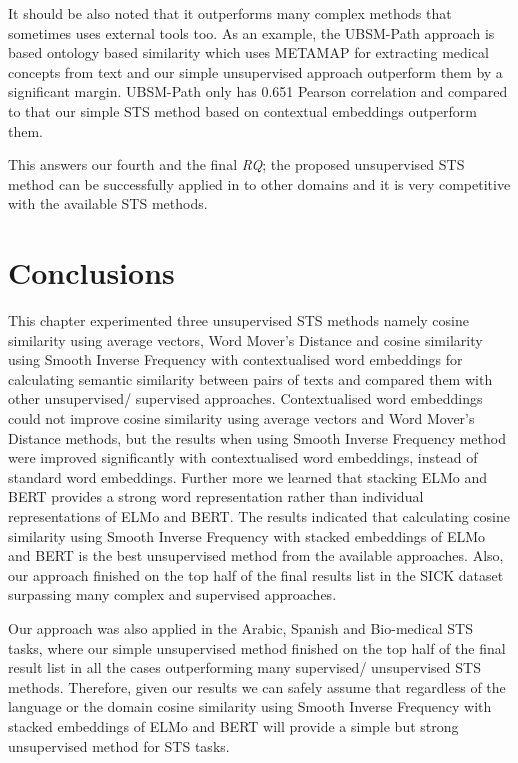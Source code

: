 It should be also noted that it outperforms many complex methods that sometimes uses external tools too. As an example, the UBSM-Path approach is based ontology based similarity which uses METAMAP \cite{Aronson2001} for extracting medical concepts from text and our simple unsupervised approach outperform them by a significant margin. UBSM-Path only has 0.651 Pearson correlation and compared to that our simple STS method based on contextual embeddings outperform them. 

This answers our fourth and the final \textit{RQ}; the proposed unsupervised STS method can be successfully applied in to other domains and it is very competitive with the available STS methods. 



\section{Conclusions}
\label{sec:state_conclusions}

This chapter experimented three unsupervised STS methods namely cosine similarity using average vectors, Word Mover's Distance and cosine similarity using Smooth Inverse Frequency with contextualised word embeddings for calculating semantic similarity between pairs of texts and compared them with other unsupervised/ supervised approaches. Contextualised word embeddings could not improve cosine similarity using average vectors and Word Mover's Distance methods, but the results when using Smooth Inverse Frequency method were improved significantly with contextualised word embeddings, instead of standard word embeddings. Further more we learned that stacking ELMo and BERT provides a strong word representation rather than individual representations of ELMo and BERT. The results indicated that calculating cosine similarity using Smooth Inverse Frequency with stacked embeddings of ELMo and BERT is the best unsupervised method from the available approaches. Also, our approach finished on the top half of the final results list in the SICK dataset surpassing many complex and supervised approaches. 

Our approach was also applied in the Arabic, Spanish and Bio-medical STS tasks, where our simple unsupervised method finished on the top half of the final result list in all the cases outperforming many supervised/ unsupervised STS methods. Therefore, given our results we can safely assume that regardless of the language or the domain cosine similarity using Smooth Inverse Frequency with stacked embeddings of ELMo and BERT will provide a simple but strong unsupervised method for STS tasks. 

